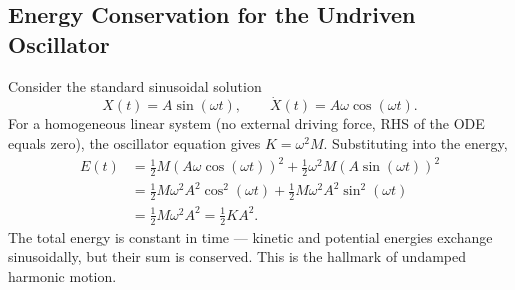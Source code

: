 \subsection{Energy Conservation for the Undriven Oscillator}

Consider the standard sinusoidal solution
\begin{equation}
    X(t) = A\sin(\omega t), \qquad \dot{X}(t) = A\omega\cos(\omega t).
\end{equation}
For a homogeneous linear system (no external driving force, RHS of the ODE equals zero), the oscillator equation gives $K = \omega^2 M$. Substituting into the energy,
\begin{align}
    E(t) &= \tfrac{1}{2}M(A\omega\cos(\omega t))^2 + \tfrac{1}{2}\omega^2 M (A\sin(\omega t))^2 \\
    &= \tfrac{1}{2}M\omega^2 A^2\cos^2(\omega t) + \tfrac{1}{2}M\omega^2 A^2\sin^2(\omega t) \\
    &= \tfrac{1}{2}M\omega^2 A^2 = \tfrac{1}{2}K A^2.
\end{align}
The total energy is constant in time --- kinetic and potential energies exchange sinusoidally, but their sum is conserved. This is the hallmark of undamped harmonic motion.
